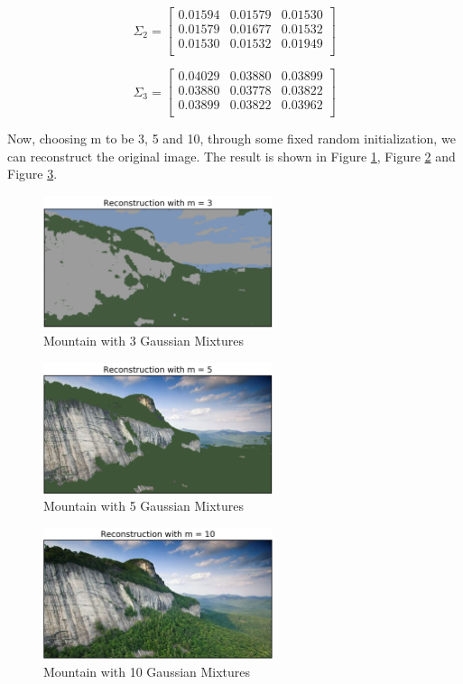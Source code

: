 $$\Sigma_2 =
\begin{bmatrix}
	0.01594 &	0.01579  &	0.01530 \\
  	0.01579 &	0.01677  &	0.01532 \\
  	0.01530 &	0.01532  &	0.01949 \\

\end{bmatrix}$$

$$\Sigma_3 =
\begin{bmatrix}
	0.04029  &	0.03880 &	0.03899 \\
  	0.03880  &	0.03778 &	0.03822 \\
  	0.03899  &	0.03822 &	0.03962 \\
\end{bmatrix}$$

Now, choosing m to be 3, 5 and 10, through some fixed random initialization, we can reconstruct the original image. The result is shown in Figure \ref{fig:self_3}, Figure \ref{fig:self_5} and Figure \ref{fig:self_10}.

\begin{figure}[H]
\centering
\includegraphics[width=0.6\textwidth]{./figures/self_3.png}
\caption{\label{fig:self_3} Mountain with 3 Gaussian Mixtures}
\end{figure}

\begin{figure}[H]
\centering
\includegraphics[width=0.6\textwidth]{./figures/self_5.png}
\caption{\label{fig:self_5} Mountain with 5 Gaussian Mixtures}
\end{figure}

\begin{figure}[H]
\centering
\includegraphics[width=0.6\textwidth]{./figures/self_10.png}
\caption{\label{fig:self_10} Mountain with 10 Gaussian Mixtures}
\end{figure}

